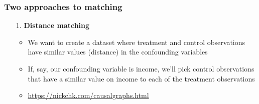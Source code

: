\documentclass[aspectratio=43]{beamer}
\begin{document}
\begin{frame}
\frametitle{Two approaches to matching}
\centering

\begin{itemize}
  \item[1.] \textbf{Distance matching}
  \begin{itemize}
    \item We want to create a dataset where treatment and control observations have similar values (distance) in the confounding variables
    \item If, say, our confounding variable is income, we'll pick control observations that have a similar value on income to each of the treatment observations
    \item \href{https://nickchk.com/causalgraphs.html}{{https://nickchk.com/causalgraphs.html}}
  \end{itemize}
\end{itemize}


\end{frame}
\end{document}
